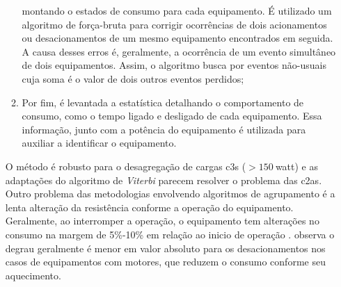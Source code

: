 \begin{enumerate}[label=\textbf{1.\arabic*},wide=\parindent]
\begin{enumerate}[label=\arabic*]
montando o estados de consumo para cada equipamento. É utilizado um
algoritmo de força-bruta para corrigir ocorrências de dois acionamentos
ou desacionamentos de um mesmo equipamento encontrados em seguida. A causa
desses erros é, geralmente, a ocorrência de um evento simultâneo de
dois equipamentos. Assim, o algoritmo busca por eventos não-usuais
cuja soma é o valor de dois outros eventos perdidos;
\item Por fim, é levantada a estatística detalhando o
comportamento de consumo, como o tempo ligado e desligado de cada
equipamento. Essa informação, junto com a potência do equipamento é
utilizada para auxiliar a identificar o equipamento. 
\end{enumerate}

O método é robusto para o desagregação de cargas \glspl{c3}
($> 150~$\acs{watt}) e as adaptações \cite{nilm_bouloutas_viterbi_ext_1991_11,
nilm_hart_fsm_viterbi_1993_12} do algoritmo de \emph{Viterbi}
parecem resolver o problema das \glspl{c2a}. Outro problema das
metodologias envolvendo algoritmos de agrupamento é a lenta alteração
da resistência conforme a operação do equipamento. Geralmente, ao
interromper a operação, o equipamento tem alterações no consumo na margem
de 5\%-10\% em relação ao inicio de operação
\cite{nilm_sultanem_1991_10}. \citeauthor*{nilm_hart_1992_8} observa
o degrau geralmente é menor em valor absoluto para os desacionamentos
nos casos de equipamentos com motores, que reduzem o consumo conforme
seu aquecimento.


\end{enumerate}
